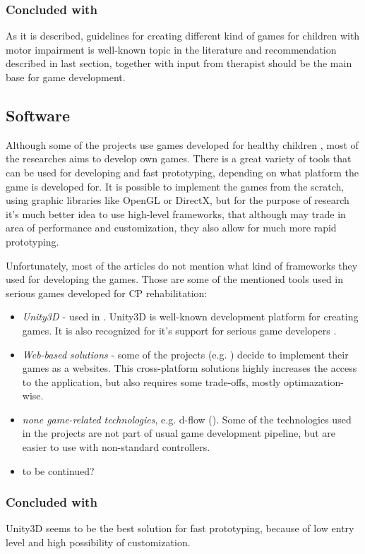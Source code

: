 \subsubsection{Concluded with}
As it is described, guidelines for creating different kind of games for children with motor impairment is well-known topic in the literature and recommendation described in last section, together with input from therapist should be the main base for game development. 

\subsection{Software}
Although some of the projects use games developed for healthy children \cite{game_xbox_360}, most of the researches aims to develop own games. There is a great variety of tools that can be used for developing and fast prototyping, depending on what platform the game is developed for. It is possible to implement the games from the scratch, using graphic libraries like OpenGL or DirectX, but for the purpose of research it's much better idea to use high-level frameworks, that although may trade in area of performance and customization, they also allow for much more rapid prototyping. 

Unfortunately, most of the articles do not mention what kind of frameworks they used for developing the games. Those are some of the mentioned tools used in serious games developed for CP rehabilitation:
\begin{itemize}
\item \emph{Unity3D \cite{unity}} - used in \cite{action}. Unity3D is well-known development platform for creating games. It is also recognized for it's support for serious game developers \cite{award}.
\item \emph{Web-based solutions} - some of the projects (e.g. \cite{inverse}) decide to implement their games as a websites. This cross-platform solutions highly increases the access to the application, but also requires some trade-offs, mostly optimazation-wise. 
\item \emph{none game-related technologies}, e.g. d-flow (\cite{bimanual}). Some of the technologies used in the projects are not part of usual game development pipeline, but are easier to use with non-standard controllers. 
\item to be continued?
\end{itemize}
\subsubsection{Concluded with}
Unity3D seems to be the best solution for fast prototyping, because of low entry level and high possibility of customization. 


